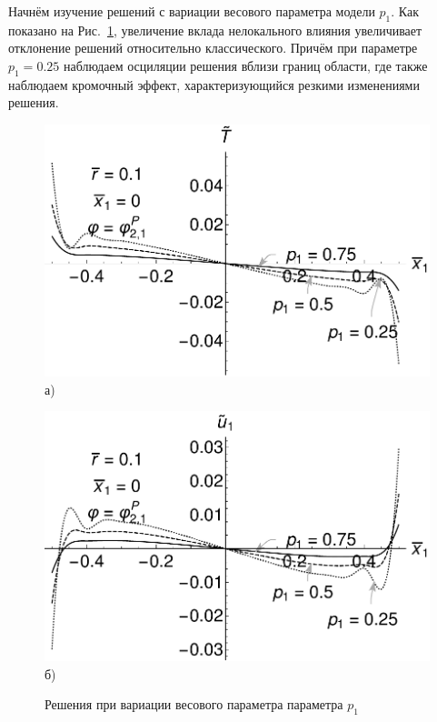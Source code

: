 Начнём изучение решений с вариации весового параметра модели $p_1$. Как показано на Рис.~\ref{fig:VariationP1}, увеличение вклада нелокального влияния увеличивает отклонение решений относительно классического. Причём при параметре $p_1 = 0.25$ наблюдаем осциляции решения вблизи границ области, где также наблюдаем кромочный эффект, характеризующийся резкими изменениями решения.

\begin{figure}[ht]
    \begin{minipage}[b][][b]{0.49\linewidth}\centering
        \includegraphics[width=\linewidth]{pics/TVarP1.pdf} \\ а)
    \end{minipage}
    \hfill
    \begin{minipage}[b][][b]{0.49\linewidth}\centering
        \includegraphics[width=\linewidth]{pics/U1VarP1.pdf} \\ б)
    \end{minipage}
    \caption{Решения при вариации весового параметра параметра $p_1$}
    \label{fig:VariationP1}
\end{figure}

